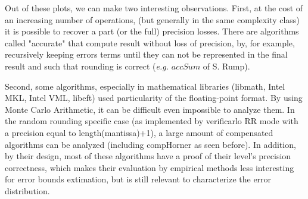 Out of these plots, we can make two interesting observations.
First, at the cost of an increasing number of operations, (but generally in the same complexity class) it is possible to recover a part (or the full) precision losses. There are algorithms called "accurate" that compute result without loss of precision, by, for example, recursively keeping errors terms until they can not be represented in the final result and such that rounding is correct ({\it e.g.} $accSum$ of S. Rump).

Second, some algorithms, especially in mathematical libraries (libmath, Intel MKL, Intel VML, libeft) used particularity of the floating-point format. By using Monte Carlo Arithmetic, it can be difficult even impossible to analyze them. In the random rounding specific case (as implemented by verificarlo RR mode with a precision equal to length(mantissa)+1), a large amount of compensated algorithms can be analyzed (including compHorner as seen before). In addition, by their design, most of these algorithms have a proof of their level's precision correctness, which makes their evaluation by empirical methods less interesting for error bounds extimation, but is still relevant to characterize the error distribution.
